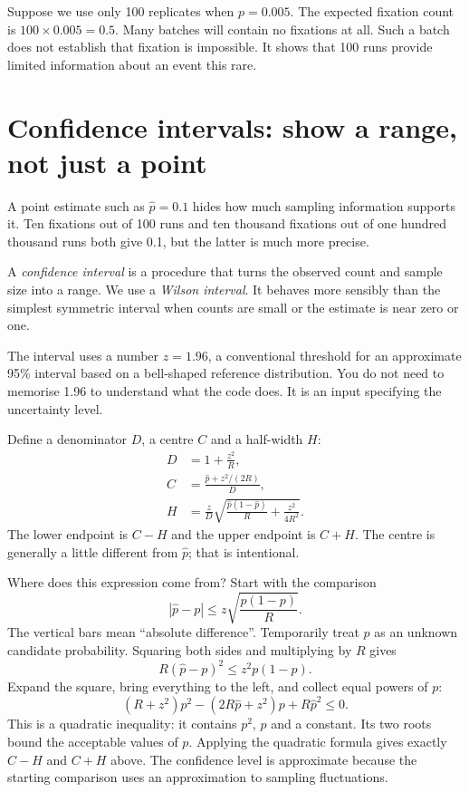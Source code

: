 \begin{workedexample}
Suppose we use only 100 replicates when $p=0.005$. The expected fixation count is $100\times0.005=0.5$. Many batches will contain no fixations at all. Such a batch does not establish that fixation is impossible. It shows that 100 runs provide limited information about an event this rare.
\end{workedexample}

\section{Confidence intervals: show a range, not just a point}

A point estimate such as $\widehat p=0.1$ hides how much sampling information supports it. Ten fixations out of 100 runs and ten thousand fixations out of one hundred thousand runs both give 0.1, but the latter is much more precise.

A \emph{confidence interval} is a procedure that turns the observed count and sample size into a range. We use a \emph{Wilson interval}. It behaves more sensibly than the simplest symmetric interval when counts are small or the estimate is near zero or one.

The interval uses a number $z=1.96$, a conventional threshold for an approximate 95\% interval based on a bell-shaped reference distribution. You do not need to memorise 1.96 to understand what the code does. It is an input specifying the uncertainty level.

Define a denominator $D$, a centre $C$ and a half-width $H$:
\begin{align}
D&=1+\frac{z^2}{R},\\
C&=\frac{\widehat p+z^2/(2R)}{D},\\
H&=\frac{z}{D}\sqrt{\frac{\widehat p(1-\widehat p)}{R}
                           +\frac{z^2}{4R^2}}.
\end{align}
The lower endpoint is $C-H$ and the upper endpoint is $C+H$. The centre is generally a little different from $\widehat p$; that is intentional.

Where does this expression come from? Start with the comparison
\[
|\widehat p-p|\leq z\sqrt{\frac{p(1-p)}{R}}.
\]
The vertical bars mean ``absolute difference''. Temporarily treat $p$ as an unknown candidate probability. Squaring both sides and multiplying by $R$ gives
\[
R(\widehat p-p)^2\leq z^2p(1-p).
\]
Expand the square, bring everything to the left, and collect equal powers of $p$:
\[
(R+z^2)p^2-(2R\widehat p+z^2)p+R\widehat p^2\leq0.
\]
This is a quadratic inequality: it contains $p^2$, $p$ and a constant. Its two roots bound the acceptable values of $p$. Applying the quadratic formula gives exactly $C-H$ and $C+H$ above. The confidence level is approximate because the starting comparison uses an approximation to sampling fluctuations.

